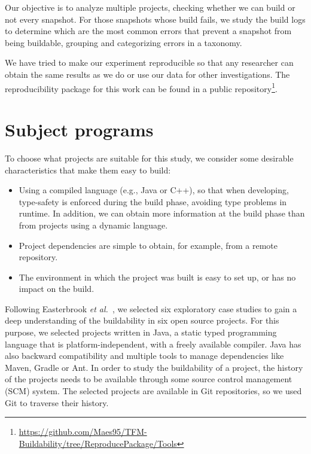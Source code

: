 Our objective is to analyze multiple projects, checking whether we can build  or not every snapshot.
For those snapshots whose build fails, we study the build logs to determine which are the most common errors that prevent a snapshot from being buildable, grouping and categorizing errors in a taxonomy.

 
We have tried to make our experiment reproducible so that any researcher can obtain the same results as we do or use our data for other investigations.
The reproducibility package for this work can be found in a public repository\footnote{\url{https://github.com/Maes95/TFM-Buildability/tree/ReproducePackage/Tools}}.


\section{Subject programs}

To choose what projects are suitable for this study, we consider some desirable characteristics that make them easy to build:

\begin{itemize}
	\item Using a compiled language (e.g., Java or C++), so that when developing, type-safety is enforced during the build phase, avoiding type problems in runtime.
In addition, we can obtain more information at the build phase than from projects using a dynamic language.
	\item Project dependencies are simple to obtain, for example, from a remote repository.
	\item The environment in which the project was built is easy to set up, or has no impact on the build.
\end{itemize}

Following Easterbrook \emph{et al.}~\cite{easterbrook2008selecting}, we selected six exploratory case studies to gain a deep understanding of the buildability in six open source projects.
For this purpose, we selected projects written in Java, a static typed programming language that is platform-independent, with a freely available compiler.
Java has also backward compatibility and multiple tools to manage dependencies like Maven, Gradle or Ant.
In order to study the buildability of a project, the history of the projects needs to be available through some source control management (SCM) system.
The selected projects are available in Git repositories, so we used Git to traverse their history.


